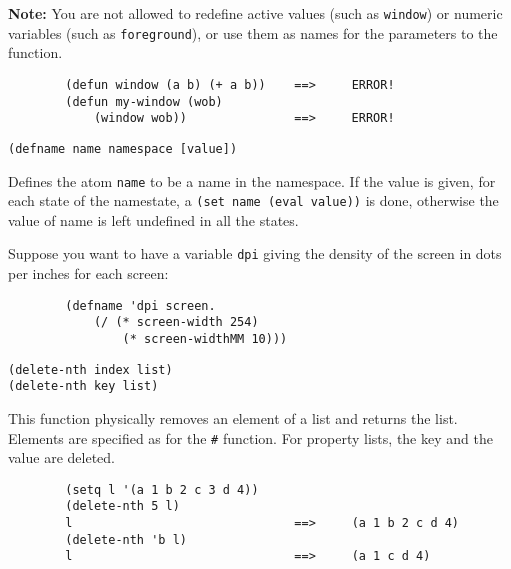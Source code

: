{\bf Note:} You are not allowed to redefine active values (such as
\verb"window") or numeric variables (such as \verb"foreground"), or use
them as names for the parameters to the function.

{\exemplefont\begin{verbatim}
        (defun window (a b) (+ a b))    ==>     ERROR!
        (defun my-window (wob) 
            (window wob))               ==>     ERROR!
\end{verbatim}}


{\usagefont\begin{verbatim}
(defname name namespace [value])
\end{verbatim}}\usageupspace

Defines the atom \verb"name" to be a name in the namespace. If the value is
given, for each state of the namestate, a \verb"(set name (eval value))" is
done, otherwise the value of name is left undefined in all the states.

Suppose you want to have a variable \verb"dpi" giving the density of the
screen in dots per inches for each screen:

{\exemplefont\begin{verbatim}
        (defname 'dpi screen.
            (/ (* screen-width 254) 
                (* screen-widthMM 10)))
\end{verbatim}}


{\usagefont\begin{verbatim}
(delete-nth index list)
(delete-nth key list)
\end{verbatim}}\usageupspace

This function physically removes an element of a list and returns the list. 
Elements are specified as for the \verb"#" function. 
For property lists, the key and the value are deleted.

{\exemplefont\begin{verbatim}
        (setq l '(a 1 b 2 c 3 d 4))
        (delete-nth 5 l)
        l                               ==>     (a 1 b 2 c d 4)
        (delete-nth 'b l)
        l                               ==>     (a 1 c d 4)
\end{verbatim}}


